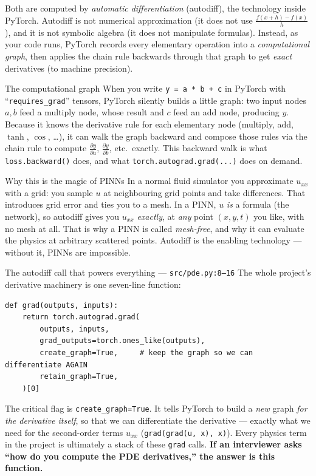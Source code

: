\documentclass[11pt,a4paper]{article}
\newcommand{\pd}[2]{\frac{\partial #1}{\partial #2}}
\begin{document}
Both are computed by \emph{automatic differentiation} (autodiff), the technology
inside PyTorch. Autodiff is not numerical approximation (it does not use
$\frac{f(x+h)-f(x)}{h}$), and it is not symbolic algebra (it does not manipulate
formulas). Instead, as your code runs, PyTorch records every elementary
operation into a \emph{computational graph}, then applies the chain rule
backwards through that graph to get \emph{exact} derivatives (to machine
precision).

\begin{conceptbox}{The computational graph}
When you write \texttt{y = a * b + c} in PyTorch with ``\texttt{requires\_grad}''
tensors, PyTorch silently builds a little graph: two input nodes $a,b$ feed a
multiply node, whose result and $c$ feed an add node, producing $y$. Because it
knows the derivative rule for each elementary node (multiply, add, $\tanh$,
$\cos$, \ldots), it can walk the graph backward and compose those rules via the
chain rule to compute $\pd{y}{a}$, $\pd{y}{b}$, etc.\ exactly. This backward
walk is what \texttt{loss.backward()} does, and what
\texttt{torch.autograd.grad(...)} does on demand.
\end{conceptbox}

\begin{intuitionbox}{Why this is the magic of PINNs}
In a normal fluid simulator you approximate $u_{xx}$ with a grid: you sample $u$
at neighbouring grid points and take differences. That introduces grid error and
ties you to a mesh. In a PINN, $u$ \emph{is} a formula (the network), so autodiff
gives you $u_{xx}$ \emph{exactly}, at \emph{any} point $(x,y,t)$ you like, with
no mesh at all. That is why a PINN is called \emph{mesh-free}, and why it can
evaluate the physics at arbitrary scattered points. Autodiff is the enabling
technology --- without it, PINNs are impossible.
\end{intuitionbox}

\begin{coderef}{The autodiff call that powers everything --- \texttt{src/pde.py:8--16}}
The whole project's derivative machinery is one seven-line function:
\begin{lstlisting}[style=pycode]
def grad(outputs, inputs):
    return torch.autograd.grad(
        outputs, inputs,
        grad_outputs=torch.ones_like(outputs),
        create_graph=True,     # keep the graph so we can differentiate AGAIN
        retain_graph=True,
    )[0]
\end{lstlisting}
The critical flag is \texttt{create\_graph=True}. It tells PyTorch to build a
\emph{new} graph \emph{for the derivative itself}, so that we can differentiate
the derivative --- exactly what we need for the second-order terms $u_{xx}$
(\texttt{grad(grad(u, x), x)}). Every physics term in the project is ultimately
a stack of these \texttt{grad} calls. \textbf{If an interviewer asks ``how do
you compute the PDE derivatives,'' the answer is this function.}
\end{coderef}
\end{document}
